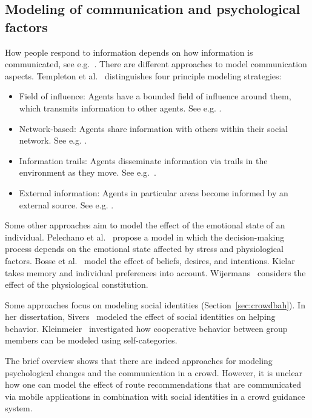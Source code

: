 \subsection{Modeling of communication and psychological factors}
How people respond to information depends on how information is communicated, see e.g.~\cite{carter-2015-life}. There are different approaches to model communication aspects. 
Templeton et al.~\cite{templeton-2023-cdyn} distinguishes four principle modeling strategies:

\begin{itemize}
\item Field of influence: Agents have a bounded field of influence around them, which transmits information to other agents. See e.g. \cite{bernardini-2014-cdyn}.
\item Network-based: Agents share information with others within their social network. See e.g. \cite{yang-2019-cdyn}.
\item Information trails: Agents disseminate information via trails in the environment as they move. See e.g.~\cite{zheng-2019-cdyn}.
\item External information: Agents in particular areas become informed by an external source. See e.g. \cite{rigos-2019-cdyn}.
\end{itemize} 

Some other approaches aim to model the effect of the emotional state of an individual. Pelechano et al.~\cite{pelechano-2005-life} propose a model in which the decision-making process depends on the emotional state affected by stress and physiological factors. Bosse et al.~\cite{bosse-2013-life} model the effect of beliefs, desires, and intentions. Kielar~\cite{kielar-2017-cdyn} takes  memory and individual preferences into account. %
Wijermans~\cite{wijermans-2011-cdyn} considers the effect of the physiological constitution.
 
Some approaches focus on modeling social identities (Section~\ref{sec:crowdbah}). In her dissertation, Sivers~\cite{sivers-2016c-cdyn} modeled the effect of social identities on helping behavior. Kleinmeier~\cite{kleinmeier-2021-cdyn} investigated how cooperative behavior between group members can be modeled using self-categories.

The brief overview shows that there are indeed approaches for modeling psychological changes and the communication in a crowd. However, it is unclear how one can model the effect of route recommendations that are communicated via mobile applications in combination with social identities in a crowd guidance system. 





